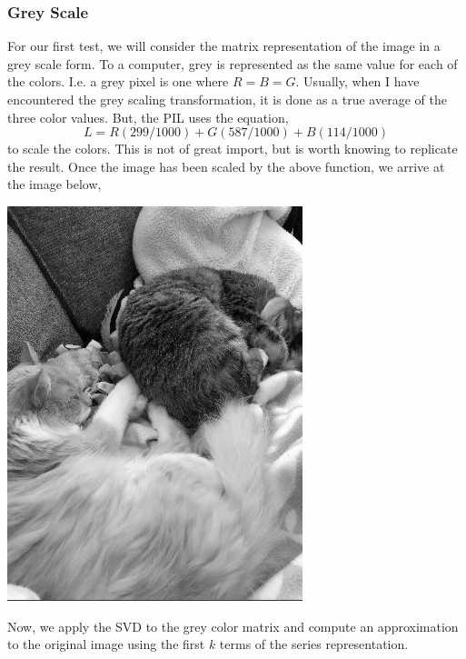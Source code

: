 \documentclass[letterpaper,12pt]{article}
\begin{document}
\subsubsection{Grey Scale}
For our first test, we will consider the matrix representation of the image in a grey scale form. To a computer, grey is represented as the same value for each of the colors. I.e. a grey pixel is one where $R=B=G$. Usually, when I have encountered the grey scaling transformation, it is done as a true average of the three color values. But, the PIL uses the equation,\cite{PIL}
\[L=R(299/1000)+G(587/1000)+B(114/1000)\]
to scale the colors. This is not of great import, but is worth knowing to replicate the result. Once the image has been scaled by the above function, we arrive at the image below,
\begin{center}
\includegraphics[scale=.75]{RasandTheaGrey.png}
\end{center}
Now, we apply the SVD to the grey color matrix and compute an approximation to the original image using the first $k$ terms of the series representation.
\end{document}
